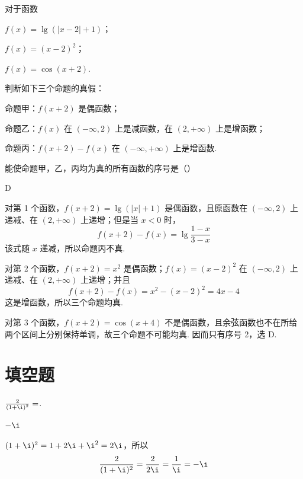 \begin{problem}
对于函数
\begin{circlelist}
\item \(f(x)=\lg(|x-2|+1)\)；
\item \(f(x)=(x-2)^2\)；
\item \(f(x)=\cos(x+2)\).
\end{circlelist}
判断如下三个命题的真假：

命题甲：\(f(x+2)\) 是偶函数；

命题乙：\(f(x)\) 在 \((-\infty,2)\) 上是减函数，在 \((2,+\infty)\) 上是增函数；

命题丙：\(f(x+2)-f(x)\) 在 \((-\infty,+\infty)\) 上是增函数. 

能使命题甲，乙，丙均为真的所有函数的序号是（\quad）

\choices
    {}
    {}
    {}
    {}
\end{problem}

\begin{answer}
D
\end{answer}

\begin{solution}
对第 1 个函数，\(f(x+2)=\lg(|x|+1)\) 是偶函数，且原函数在 \((-\infty,2)\) 上递减、在 \((2,+\infty)\) 上递增；但是当 \(x<0\) 时，
\[
f(x+2)-f(x)=\lg\dfrac{1-x}{3-x}
\]
该式随 \(x\) 递减，所以命题丙不真.

对第 2 个函数，\(f(x+2)=x^2\) 是偶函数；\(f(x)=(x-2)^2\) 在 \((-\infty,2)\) 上递减、在 \((2,+\infty)\) 上递增；并且
\[
f(x+2)-f(x)=x^2-(x-2)^2=4x-4
\]
这是增函数，所以三个命题均真.

对第 3 个函数，\(f(x+2)=\cos(x+4)\) 不是偶函数，且余弦函数也不在所给两个区间上分别保持单调，故三个命题不可能均真. 因而只有序号 2，选 D.
\end{solution}

\section{填空题}
\begin{problem}
\(\frac{2}{(1 + \i)^2} =\)\fillinblank{}.
\end{problem}

\begin{answer}
\(-\i\)
\end{answer}

\begin{solution}
\((1+\i)^2=1+2\i+\i^2=2\i\)，所以
\[
\frac{2}{(1+\i)^2}=\frac{2}{2\i}=\frac1\i=-\i
\]
\end{solution}

